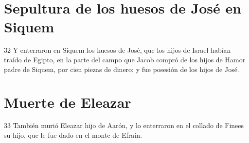\section*{Sepultura de los huesos de José en Siquem}

32 Y enterraron en Siquem los huesos de José, que los hijos de Israel habían traído de Egipto, en la parte del campo que Jacob compró de los hijos de Hamor padre de Siquem, por cien piezas de dinero; y fue posesión de los hijos de José.
\section*{Muerte de Eleazar}

33 También murió Eleazar hijo de Aarón, y lo enterraron en el collado de Finees su hijo, que le fue dado en el monte de Efraín.

